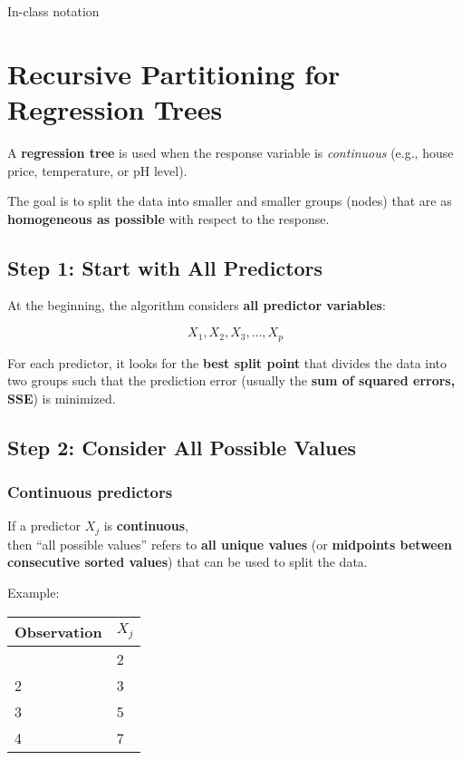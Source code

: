 \documentclass[
  letterpaper,
  DIV=11,
  numbers=noendperiod]{scrreprt}
\begin{document}
In-class notation

\section{Recursive Partitioning for Regression
Trees}\label{recursive-partitioning-for-regression-trees-1}

A \textbf{regression tree} is used when the response variable is
\emph{continuous} (e.g., house price, temperature, or pH level).

The goal is to split the data into smaller and smaller groups (nodes)
that are as \textbf{homogeneous as possible} with respect to the
response.

\subsection{Step 1: Start with All
Predictors}\label{step-1-start-with-all-predictors}

At the beginning, the algorithm considers \textbf{all predictor
variables}:

\[X_1, X_2, X_3, \dots, X_p\]

For each predictor, it looks for the \textbf{best split point} that
divides the data into two groups such that the prediction error (usually
the \textbf{sum of squared errors, SSE}) is minimized.

\subsection{Step 2: Consider All Possible
Values}\label{step-2-consider-all-possible-values}

\subsubsection{Continuous predictors}\label{continuous-predictors}

If a predictor \(X_j\) is \textbf{continuous},\\
then ``all possible values'' refers to \textbf{all unique values} (or
\textbf{midpoints between consecutive sorted values}) that can be used
to split the data.

Example:

\begin{longtable}[]{@{}ll@{}}
\toprule\noalign{}
Observation & \(X_j\) \\
\midrule\noalign{}
\endhead
\bottomrule\noalign{}
\endlastfoot
1 & 2 \\
2 & 3 \\
3 & 5 \\
4 & 7 \\
\end{longtable}
\end{document}
